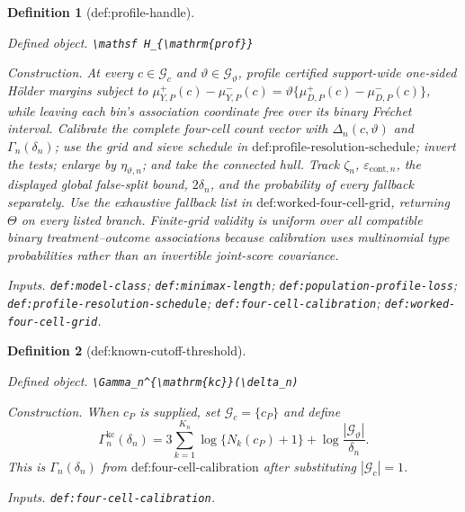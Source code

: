 \documentclass{article}
\newtheorem{definition}{Definition}
\begin{document}
\begin{definition}[def:profile-handle]\label{def:profile-handle}
\par\smallskip\noindent\emph{Defined object.} \texttt{\textbackslash{}\allowbreak{}mathsf H\_\allowbreak{}\{\textbackslash{}\allowbreak{}mathrm\{prof\}\allowbreak{}\}\allowbreak{}}
\par\smallskip\noindent\emph{Construction.} At every \(c\in\mathcal G_c\) and \(\vartheta\in\mathcal G_\vartheta\), profile certified support-wide one-sided H\"older margins subject to \(\mu_{Y,P}^{+}(c)-\mu_{Y,P}^{-}(c)=\vartheta\{\mu_{D,P}^{+}(c)-\mu_{D,P}^{-}(c)\}\), while leaving each bin's association coordinate free over its binary Fr\'echet interval. Calibrate the complete four-cell count vector with \(\Delta_n(c,\vartheta)\) and \(\Gamma_n(\delta_n)\); use the grid and sieve schedule in \(\text{def:profile-resolution-schedule}\); invert the tests; enlarge by \(\eta_{\vartheta,n}\); and take the connected hull. Track \(\zeta_n\), \(\varepsilon_{\mathrm{cont},n}\), the displayed global false-split bound, \(2\delta_n\), and the probability of every fallback separately. Use the exhaustive fallback list in \(\text{def:worked-four-cell-grid}\), returning \(\Theta\) on every listed branch. Finite-grid validity is uniform over all compatible binary treatment--outcome associations because calibration uses multinomial type probabilities rather than an invertible joint-score covariance.
\par\smallskip\noindent\emph{Inputs.} \texttt{def:\allowbreak{}model-\allowbreak{}class}; \texttt{def:\allowbreak{}minimax-\allowbreak{}length}; \texttt{def:\allowbreak{}population-\allowbreak{}profile-\allowbreak{}loss}; \texttt{def:\allowbreak{}profile-\allowbreak{}resolution-\allowbreak{}schedule}; \texttt{def:\allowbreak{}four-\allowbreak{}cell-\allowbreak{}calibration}; \texttt{def:\allowbreak{}worked-\allowbreak{}four-\allowbreak{}cell-\allowbreak{}grid}.
\end{definition}

\begin{definition}[def:known-cutoff-threshold]\label{def:known-cutoff-threshold}
\par\smallskip\noindent\emph{Defined object.} \texttt{\textbackslash{}\allowbreak{}Gamma\_\allowbreak{}n\textasciicircum{}\{\textbackslash{}\allowbreak{}mathrm\{kc\}\allowbreak{}\}\allowbreak{}(\textbackslash{}\allowbreak{}delta\_\allowbreak{}n)}
\par\smallskip\noindent\emph{Construction.} When \(c_P\) is supplied, set \(\mathcal G_c=\{c_P\}\) and define \[\Gamma_n^{\mathrm{kc}}(\delta_n)=3\sum_{k=1}^{K_n}\log\{N_k(c_P)+1\}+\log\frac{|\mathcal G_\vartheta|}{\delta_n}.\] This is \(\Gamma_n(\delta_n)\) from \(\text{def:four-cell-calibration}\) after substituting \(|\mathcal G_c|=1\).
\par\smallskip\noindent\emph{Inputs.} \texttt{def:\allowbreak{}four-\allowbreak{}cell-\allowbreak{}calibration}.
\end{definition}
\end{document}
